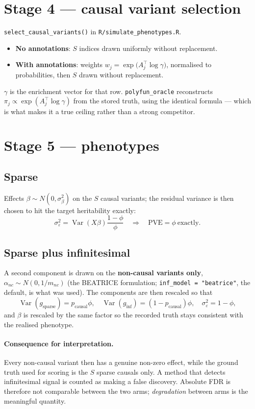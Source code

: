 \documentclass[11pt,a4paper]{article}
\newcommand{\file}[1]{\texttt{\small #1}}
\begin{document}
\section{Stage 4 --- causal variant selection}

\file{select\_causal\_variants()} in \file{R/simulate\_phenotypes.R}.

\begin{itemize}
\item \textbf{No annotations}: $S$ indices drawn uniformly without replacement.
\item \textbf{With annotations}: weights
$w_j=\exp\!\big(A_j^\top\log\gamma\big)$, normalised to probabilities, then $S$
drawn without replacement.
\end{itemize}

$\gamma$ is the enrichment vector for that row. \file{polyfun\_oracle}
reconstructs $\pi_j\propto\exp(A_j^\top\log\gamma)$ from the stored truth,
using the identical formula --- which is what makes it a true ceiling rather
than a strong competitor.

\section{Stage 5 --- phenotypes}

\subsection{Sparse}
Effects $\beta\sim N(0,\sigma^2_\beta)$ on the $S$ causal variants; the residual
variance is then chosen to hit the target heritability exactly:
\[
\sigma^2_\varepsilon=\operatorname{Var}(X\beta)\frac{1-\phi}{\phi}
\quad\Longrightarrow\quad \mathrm{PVE}=\phi\ \text{exactly}.
\]

\subsection{Sparse plus infinitesimal}
A second component is drawn on the \textbf{non-causal variants only},
$\alpha_{nc}\sim N(0,1/m_{nc})$ (the BEATRICE formulation;
\texttt{inf\_model = "beatrice"}, the default, is what was used). The components
are then rescaled so that
\[
\operatorname{Var}(g_{\text{sparse}})=p_{\text{causal}}\phi,\quad
\operatorname{Var}(g_{\text{inf}})=(1-p_{\text{causal}})\phi,\quad
\sigma^2_\varepsilon=1-\phi,
\]
and $\beta$ is rescaled by the same factor so the recorded truth stays
consistent with the realised phenotype.

\paragraph{Consequence for interpretation.} Every non-causal variant then has a
genuine non-zero effect, while the ground truth used for scoring is the $S$
sparse causals only. A method that detects infinitesimal signal is counted as
making a false discovery. Absolute FDR is therefore not comparable between the
two arms; \emph{degradation} between arms is the meaningful quantity.
\end{document}

